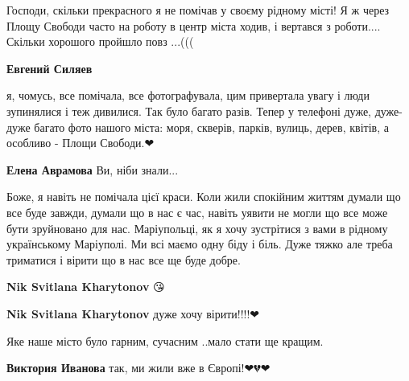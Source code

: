  
 
 
 
 

\qqSecCmt


Господи, скільки прекрасного я не помічав у своєму рідному місті! Я ж через
Площу Свободи часто на роботу в центр міста ходив, і вертався з роботи....
Скільки хорошого пройшло повз ...(((

\begin{itemize} %
\textbf{Евгений Силяев} 

я, чомусь, все помічала, все фотографувала, цим привертала увагу і люди
зупинялися і теж дивилися. Так було багато разів. Тепер у телефоні дуже,
дуже-дуже багато фото нашого міста: моря, скверів, парків, вулиць, дерев,
квітів, а особливо - Площи Свободи.❤

\textbf{Елена Аврамова} Ви, ніби знали...

\end{itemize} %


Боже, я навіть не помічала цієї краси. Коли жили спокійним життям думали що все
буде завжди, думали що в нас є час, навіть уявити не могли що все може бути
зруйновано для нас. Маріупольці, як я хочу зустрітися з вами в рідному
українському Маріуполі. Ми всі маємо одну біду і біль. Дуже тяжко але треба
триматися і вірити що в нас все ще буде добре.

\begin{itemize} %
\textbf{Nik Svitlana Kharytonov} 😘

\textbf{Nik Svitlana Kharytonov} дуже хочу вірити!!!!❤
\end{itemize} %


Яке наше місто було гарним, сучасним ..мало стати ще кращим.

\begin{itemize} %
\textbf{Виктория Иванова} так, ми жили вже в Європі!❤💔❤
\end{itemize} %

